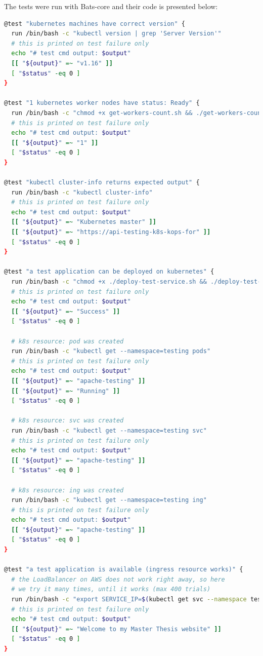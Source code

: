 The tests were run with Bats-core and their code is presented below:
\begin{lstlisting}[basicstyle=\tiny,caption={TODO},captionpos=b,language=Bash,xleftmargin=1cm]
@test "kubernetes machines have correct version" {
  run /bin/bash -c "kubectl version | grep 'Server Version'"
  # this is printed on test failure only
  echo "# test cmd output: $output"
  [[ "${output}" =~ "v1.16" ]]
  [ "$status" -eq 0 ]
}

@test "1 kubernetes worker nodes have status: Ready" {
  run /bin/bash -c "chmod +x get-workers-count.sh && ./get-workers-count.sh"
  # this is printed on test failure only
  echo "# test cmd output: $output"
  [[ "${output}" =~ "1" ]]
  [ "$status" -eq 0 ]
}

@test "kubectl cluster-info returns expected output" {
  run /bin/bash -c "kubectl cluster-info"
  # this is printed on test failure only
  echo "# test cmd output: $output"
  [[ "${output}" =~ "Kubernetes master" ]]
  [[ "${output}" =~ "https://api-testing-k8s-kops-for" ]]
  [ "$status" -eq 0 ]
}

@test "a test application can be deployed on kubernetes" {
  run /bin/bash -c "chmod +x ./deploy-test-service.sh && ./deploy-test-service.sh"
  # this is printed on test failure only
  echo "# test cmd output: $output"
  [[ "${output}" =~ "Success" ]]
  [ "$status" -eq 0 ]

  # k8s resource: pod was created
  run /bin/bash -c "kubectl get --namespace=testing pods"
  # this is printed on test failure only
  echo "# test cmd output: $output"
  [[ "${output}" =~ "apache-testing" ]]
  [[ "${output}" =~ "Running" ]]
  [ "$status" -eq 0 ]

  # k8s resource: svc was created
  run /bin/bash -c "kubectl get --namespace=testing svc"
  # this is printed on test failure only
  echo "# test cmd output: $output"
  [[ "${output}" =~ "apache-testing" ]]
  [ "$status" -eq 0 ]

  # k8s resource: ing was created
  run /bin/bash -c "kubectl get --namespace=testing ing"
  # this is printed on test failure only
  echo "# test cmd output: $output"
  [[ "${output}" =~ "apache-testing" ]]
  [ "$status" -eq 0 ]
}

@test "a test application is available (ingress resource works)" {
  # the LoadBalancer on AWS does not work right away, so here
  # we try it many times, until it works (max 400 trials)
  run /bin/bash -c "export SERVICE_IP=$(kubectl get svc --namespace testing apache-testing --template '{{ range (index .status.loadBalancer.ingress 0) }}{{.}}{{ end }}') && chmod +x test-timeout-until.sh && ./test-timeout-until.sh \"curl --max-time 2 -L http://\$SERVICE_IP 2>/dev/null | grep 'Welcome to my Master Thesis website'\" \"400\" \"curl --max-time 2 -L http://\$SERVICE_IP 2>/dev/null | grep 'Welcome to my Master Thesis website'\""
  # this is printed on test failure only
  echo "# test cmd output: $output"
  [[ "${output}" =~ "Welcome to my Master Thesis website" ]]
  [ "$status" -eq 0 ]
}


\end{lstlisting}
